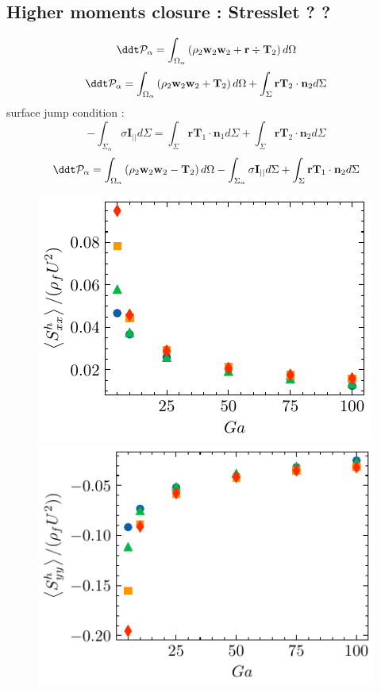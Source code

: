 
\subsection{Higher moments closure : Stresslet ? ? }


\begin{equation}
    \ddt \mathcal{P}_\alpha
    = \int_{\Omega_\alpha} \left(
        \rho_2  \textbf{w}_2 \textbf{w}_2 
        + \textbf{r} \div \mathbf{T}_2
    \right) d\Omega
\end{equation}
\begin{equation}
    \ddt \mathcal{P}_\alpha
    = \int_{\Omega_\alpha} \left(
        \rho_2  \textbf{w}_2 \textbf{w}_2 
        + \mathbf{T}_2
    \right) d\Omega
+ \int_{\Sigma}\textbf{rT}_2 \cdot \textbf{n}_2 d\Sigma
\end{equation}
surface jump condition : 
\begin{equation}
    - \int_{\Sigma_\alpha} 
    \sigma \textbf{I}_{||}
d\Sigma
= \int_{\Sigma}\textbf{rT}_1 \cdot \textbf{n}_1 d\Sigma
+ \int_{\Sigma}\textbf{rT}_2 \cdot \textbf{n}_2 d\Sigma
\end{equation}
\begin{equation}
    \ddt \mathcal{P}_\alpha
    = \int_{\Omega_\alpha} \left(
        \rho_2  \textbf{w}_2 \textbf{w}_2 
        - \mathbf{T}_2
    \right) d\Omega
    - \int_{\Sigma_\alpha} 
        \sigma \textbf{I}_{||}
    d\Sigma
    + \int_{\Sigma}\textbf{rT}_1 \cdot \textbf{n}_2 d\Sigma
\end{equation}
\begin{figure}[h!]
    \centering
    \includegraphics[height=0.3\textwidth]{image/HOMOGENEOUS/fPA/Sxx.pdf}
    \includegraphics[height=0.3\textwidth]{image/HOMOGENEOUS/fPA/Syy.pdf}
\end{figure}
